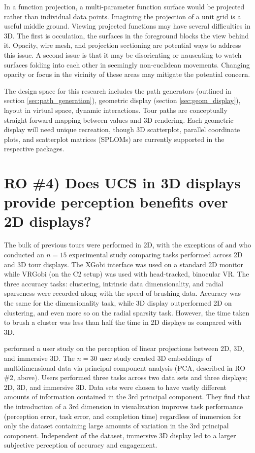 \documentclass{monashthesis}
\begin{document}
In a function projection, a multi-parameter function surface would be
projected rather than individual data points. Imagining the projection
of a unit grid is a useful middle ground. Viewing projected functions
may have several difficulties in 3D. The first is occulation, the
surfaces in the foreground blocks the view behind it. Opacity, wire
mesh, and projection sectioning \autocite{furnas_prosection_1994} are
potential ways to address this issue. A second issue is that it may be
disorienting or nauseating to watch surfaces folding into each other in
seemingly non-euclidean movements. Changing opacity or focus in the
vicinity of these areas may mitigate the potential concern.

The design space for this research includes the path generators
(outlined in section \ref{sec:path_generation}), geometric display
(section \ref{sec:geom_display}), layout in virtual space, dynamic
interactions. Tour paths are conceptually straight-forward mapping
between values and 3D rendering. Each geometric display will need unique
recreation, though 3D scatterplot, parallel coordinate plots, and
scatterplot matrices (SPLOMs) are currently supported in the respective
packages.

\section{RO \#4) Does UCS in 3D displays provide perception benefits
over 2D displays?}\label{UCS_3dvs2d}

The bulk of previous tours were performed in 2D, with the exceptions of
\textcite{nelson_xgobi_1998} and \textcite{arms_benefits_1999} who
conducted an \(n=15\) experimental study comparing tasks performed
across 2D and 3D tour displays. The XGobi interface was used on a
standard 2D monitor while VRGobi (on the C2 setup) was used with
head-tracked, binocular VR. The three accuracy tasks: clustering,
intrinsic data dimensionality, and radial sparseness were recorded along
with the speed of brushing data. Accuracy was the same for the
dimensionality task, while 3D display outperformed 2D on clustering, and
even more so on the radial sparsity task. However, the time taken to
brush a cluster was less than half the time in 2D displays as compared
with 3D.

\textcite{wagner_filho_immersive_2018} performed a user study on the
perception of linear projections between 2D, 3D, and immersive 3D. The
\(n=30\) user study created 3D embeddings of multidimensional data via
principal component analysis (PCA, described in RO \#2, above). Users
performed three tasks across two data sets and three displays; 2D, 3D,
and immersive 3D. Data sets were chosen to have vastly different amounts
of information contained in the 3rd principal component. They find that
the introduction of a 3rd dimension in visualization improves task
performance (perception error, task error, and completion time)
regardless of immersion for only the dataset containing large amounts of
variation in the 3rd principal component. Independent of the dataset,
immersive 3D display led to a larger subjective perception of accuracy
and engagement.
\end{document}
